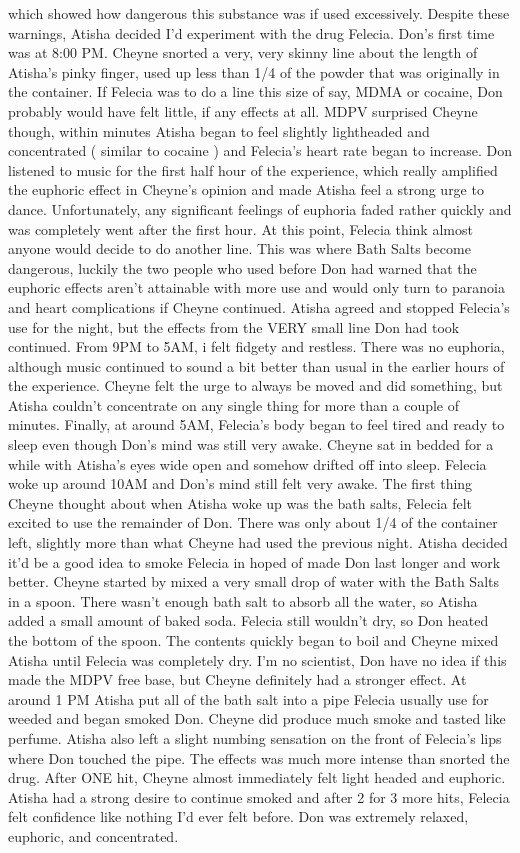 \documentclass[12pt]{book}
\begin{document}
which showed how dangerous this substance was if used excessively. Despite these warnings, Atisha decided I'd experiment with the drug Felecia. Don's first time was at 8:00 PM. Cheyne snorted a very, very skinny line about the length of Atisha's pinky finger, used up less than 1/4 of the powder that was originally in the container. If Felecia was to do a line this size of say, MDMA or cocaine, Don probably would have felt little, if any effects at all. MDPV surprised Cheyne though, within minutes Atisha began to feel slightly lightheaded and concentrated ( similar to cocaine ) and Felecia's heart rate began to increase. Don listened to music for the first half hour of the experience, which really amplified the euphoric effect in Cheyne's opinion and made Atisha feel a strong urge to dance. Unfortunately, any significant feelings of euphoria faded rather quickly and was completely went after the first hour. At this point, Felecia think almost anyone would decide to do another line. This was where Bath Salts become dangerous, luckily the two people who used before Don had warned that the euphoric effects aren't attainable with more use and would only turn to paranoia and heart complications if Cheyne continued. Atisha agreed and stopped Felecia's use for the night, but the effects from the VERY small line Don had took continued. From 9PM to 5AM, i felt fidgety and restless. There was no euphoria, although music continued to sound a bit better than usual in the earlier hours of the experience. Cheyne felt the urge to always be moved and did something, but Atisha couldn't concentrate on any single thing for more than a couple of minutes. Finally, at around 5AM, Felecia's body began to feel tired and ready to sleep even though Don's mind was still very awake. Cheyne sat in bedded for a while with Atisha's eyes wide open and somehow drifted off into sleep. Felecia woke up around 10AM and Don's mind still felt very awake. The first thing Cheyne thought about when Atisha woke up was the bath salts, Felecia felt excited to use the remainder of Don. There was only about 1/4 of the container left, slightly more than what Cheyne had used the previous night. Atisha decided it'd be a good idea to smoke Felecia in hoped of made Don last longer and work better. Cheyne started by mixed a very small drop of water with the Bath Salts in a spoon. There wasn't enough bath salt to absorb all the water, so Atisha added a small amount of baked soda. Felecia still wouldn't dry, so Don heated the bottom of the spoon. The contents quickly began to boil and Cheyne mixed Atisha until Felecia was completely dry. I'm no scientist, Don have no idea if this made the MDPV free base, but Cheyne definitely had a stronger effect. At around 1 PM Atisha put all of the bath salt into a pipe Felecia usually use for weeded and began smoked Don. Cheyne did produce much smoke and tasted like perfume. Atisha also left a slight numbing sensation on the front of Felecia's lips where Don touched the pipe. The effects was much more intense than snorted the drug. After ONE hit, Cheyne almost immediately felt light headed and euphoric. Atisha had a strong desire to continue smoked and after 2 for 3 more hits, Felecia felt confidence like nothing I'd ever felt before. Don was extremely relaxed, euphoric, and concentrated. 
\end{document}
